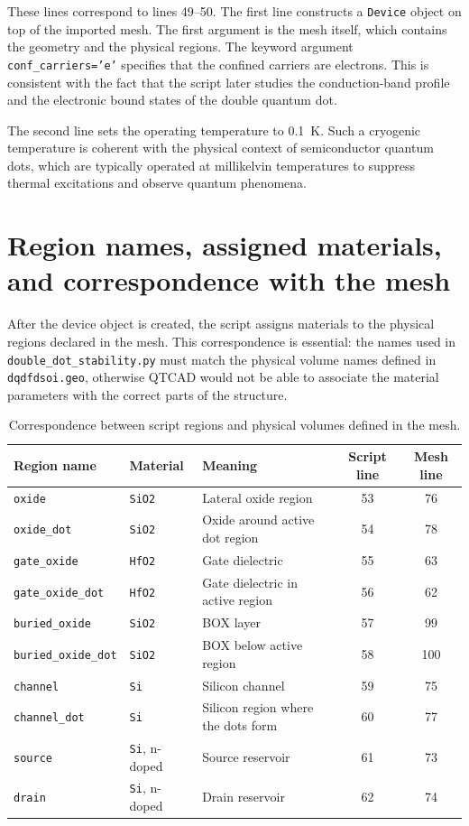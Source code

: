 These lines correspond to lines 49--50. The first line constructs a \texttt{Device} object on top of the imported mesh. The first argument is the mesh itself, which contains the geometry and the physical regions. The keyword argument \texttt{conf\_carriers='e'} specifies that the confined carriers are electrons. This is consistent with the fact that the script later studies the conduction-band profile and the electronic bound states of the double quantum dot.

The second line sets the operating temperature to \SI{0.1}{\kelvin}. Such a cryogenic temperature is coherent with the physical context of semiconductor quantum dots, which are typically operated at millikelvin temperatures to suppress thermal excitations and observe quantum phenomena.
\section{Region names, assigned materials, and correspondence with the mesh}
After the device object is created, the script assigns materials to the physical regions declared in the mesh. This correspondence is essential: the names used in \texttt{double\_dot\_stability.py} must match the physical volume names defined in \texttt{dqdfdsoi.geo}, otherwise QTCAD would not be able to associate the material parameters with the correct parts of the structure.

\begin{table}[H]
\centering
\begin{tabular}{|p{2.5cm}|p{1.6cm}|p{4.4cm}|c|c|}
\hline
\textbf{Region name} & \textbf{Material} & \textbf{Meaning} & \textbf{Script line} & \textbf{Mesh line} \\
\hline
\texttt{oxide} & \texttt{SiO2} & Lateral oxide region & 53 & 76 \\
\hline
\texttt{oxide\_dot} & \texttt{SiO2} & Oxide around active dot region & 54 & 78 \\
\hline
\texttt{gate\_oxide} & \texttt{HfO2} & Gate dielectric & 55 & 63 \\
\hline
\texttt{gate\_oxide\_dot} & \texttt{HfO2} & Gate dielectric in active region & 56 & 62 \\
\hline
\texttt{buried\_oxide} & \texttt{SiO2} & BOX layer & 57 & 99 \\
\hline
\texttt{buried\_oxide\_dot} & \texttt{SiO2} & BOX below active region & 58 & 100 \\
\hline
\texttt{channel} & \texttt{Si} & Silicon channel & 59 & 75 \\
\hline
\texttt{channel\_dot} & \texttt{Si} & Silicon region where the dots form & 60 & 77 \\
\hline
\texttt{source} & \texttt{Si}, n-doped & Source reservoir & 61 & 73 \\
\hline
\texttt{drain} & \texttt{Si}, n-doped & Drain reservoir & 62 & 74 \\
\hline
\end{tabular}
\caption{Correspondence between script regions and physical volumes defined in the mesh.}
\label{tab:region-map}
\end{table}

